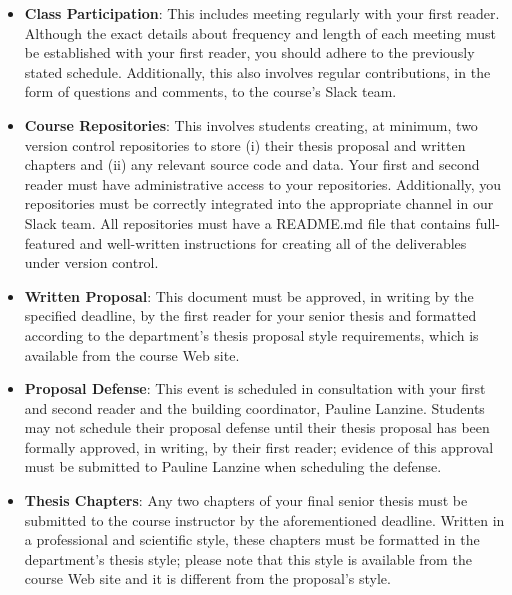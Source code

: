 \begin{itemize}
  \itemsep -.25em

  \item {\bf Class Participation}: This includes meeting regularly with your first reader. Although the exact details
    about frequency and length of each meeting must be established with your first reader, you should adhere to the
    previously stated schedule. Additionally, this also involves regular contributions, in the form of questions and
    comments, to the course's Slack team.

  \item {\bf Course Repositories}: This involves students creating, at minimum, two version control repositories to
    store (i) their thesis proposal and written chapters and (ii) any relevant source code and data. Your first and
    second reader must have administrative access to your repositories. Additionally, you repositories must be correctly
    integrated into the appropriate channel in our Slack team. All repositories must have a README.md file that contains
    full-featured and well-written instructions for creating all of the deliverables under version control.

  \item {\bf Written Proposal}: This document must be approved, in writing by the specified deadline, by the first
    reader for your senior thesis and formatted according to the department's thesis proposal style requirements,
    which is available from the course Web site.

  \item {\bf Proposal Defense}: This event is scheduled in consultation with your first and second reader and the
    building coordinator, Pauline Lanzine. Students may not schedule their proposal defense until their thesis proposal
    has been formally approved, in writing, by their first reader; evidence of this approval must be submitted to
    Pauline Lanzine when scheduling the defense.

  \item {\bf Thesis Chapters}: Any two chapters of your final senior thesis must be submitted to the course instructor
    by the aforementioned deadline.  Written in a professional and scientific style, these chapters must be formatted in
    the department's thesis style; please note that this style is available from the course Web site and it is different
    from the proposal's style.

\end{itemize}

